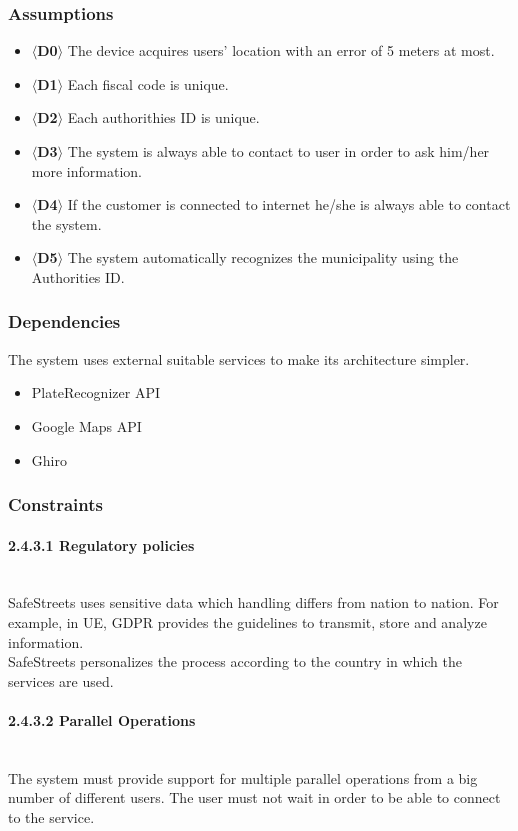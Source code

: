 \documentclass{article}
\begin{document}
\subsubsection{Assumptions}
\begin{itemize}
    \item $\langle$\textbf{D0}$\rangle$ The device acquires users' location with
    an error of 5 meters at most.
    \item $\langle$\textbf{D1}$\rangle$ Each fiscal code is unique.
    \item $\langle$\textbf{D2}$\rangle$ Each authorithies ID is unique.
    \item $\langle$\textbf{D3}$\rangle$ The system is always able to contact to
    user in order to ask him/her more information.
    \item $\langle$\textbf{D4}$\rangle$ If the customer is connected to internet
    he/she is always able to contact the system.
    \item $\langle$\textbf{D5}$\rangle$ The system automatically recognizes the
    municipality using the Authorities ID.
\end{itemize}
\subsubsection{Dependencies}
The system uses external suitable services to make its architecture simpler.
\begin{itemize}
    \item PlateRecognizer API
    \item Google Maps API
    \item Ghiro
\end{itemize}
\subsubsection{Constraints}
\paragraph{2.4.3.1 Regulatory policies}\mbox{}\\
SafeStreets uses sensitive data which handling differs from nation to nation.
For example, in UE, GDPR provides the guidelines to transmit, store and analyze
information.\\ SafeStreets personalizes the process according to the country in
which the services are used. \paragraph{2.4.3.2 Parallel Operations}\mbox{}\\
The system must provide support for multiple parallel operations from a big
number of different users. The user must not wait in order to be able to connect
to the service.
\newpage
\end{document}
